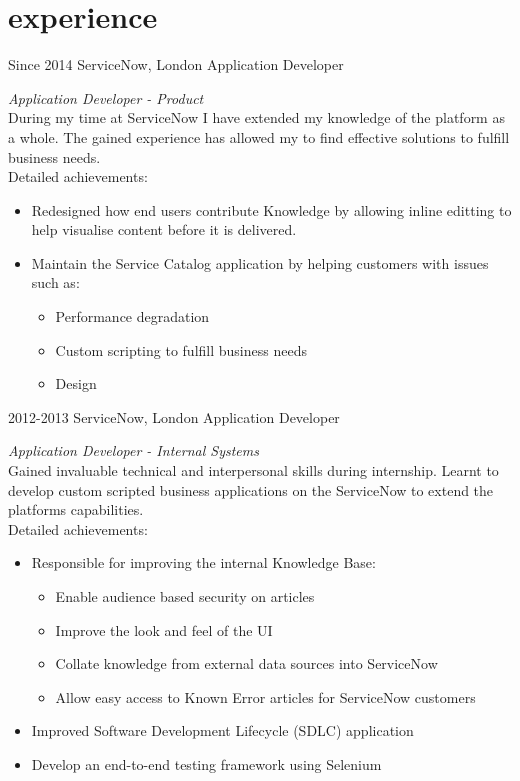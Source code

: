 \documentclass[]{friggeri-cv}
\begin{document}
\section{experience}

\begin{entrylist}
  \entry
    {Since 2014}
    {ServiceNow, London}
    {Application Developer}
    {\emph{Application Developer - Product} \\
    During my time at ServiceNow I have extended my knowledge of the platform as a whole. The gained experience has allowed my to find effective solutions to fulfill business needs. \\
    Detailed achievements: 
    \begin{itemize}
    
        \item {Redesigned how end users contribute Knowledge by allowing inline editting to help visualise content before it is delivered.}
        \item {Maintain the Service Catalog application by helping customers with issues such as:}
        \begin{itemize}
            \item {Performance degradation}
            \item {Custom scripting to fulfill business needs}
            \item {Design}
        \end{itemize}
    \end{itemize}
    }
  \entry
    {2012-2013}
    {ServiceNow, London}
    {Application Developer}
    {\emph{Application Developer - Internal Systems} \\
    Gained invaluable technical and interpersonal skills during internship. Learnt to develop custom scripted business applications on the ServiceNow to extend the platforms capabilities. \\
    Detailed achievements:
    \begin{itemize}
        \item {Responsible for improving the internal Knowledge Base:}
             \begin{itemize}
                \item {Enable audience based security on articles}
                \item {Improve the look and feel of the UI}
                \item {Collate knowledge from external data sources into ServiceNow}
                \item {Allow easy access to Known Error articles for ServiceNow customers}
            \end{itemize}
        \item {Improved Software Development Lifecycle (SDLC) application}
        \item {Develop an end-to-end testing framework using Selenium}
    \end{itemize}
    }
\end{entrylist}
\end{document}
